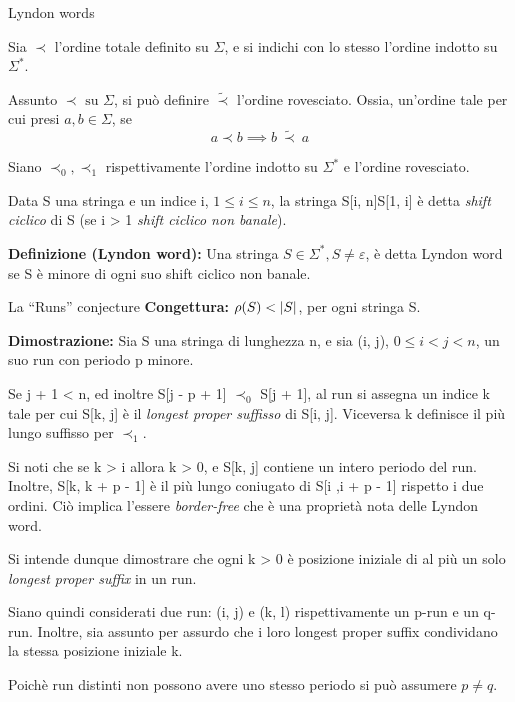 \documentclass{beamer}
\begin{document}
    \begin{frame}{Lyndon words}

        Sia \(\prec\) l'ordine totale definito su \(\Sigma\),
        e si indichi con lo stesso l'ordine indotto su \(\Sigma^{*}\).
        
        Assunto \(\prec \text{ su } \Sigma\), si può definire \(\tilde{\prec}\)
        l'ordine rovesciato. Ossia, un'ordine tale per cui presi \(a, b \in \Sigma\),
        se 
        \[
            a \prec b \implies b \ \tilde{\prec} \ a
        \]

        Siano \(\prec_{0}, \prec_{1}\) rispettivamente l'ordine indotto su 
        \(\Sigma^{*}\) e l'ordine rovesciato.

    \end{frame}
    \begin{frame}
        Data S una stringa e un indice i, \(1 \le i \le n\),
        la stringa S[i, n]S[1, i] è detta \emph{shift ciclico} di S 
        (se i > 1 \emph{shift ciclico non banale}).

        \textbf{Definizione (Lyndon word): } 
        Una stringa \(S \in \Sigma^{*}, S \ne \varepsilon\),
        è detta Lyndon word se S è minore di ogni suo shift ciclico non banale.
    \end{frame}
    \begin{frame}{La ``Runs'' conjecture}
        \textbf{Congettura: } \(\rho(S) < \left\lvert S \right\rvert\), per ogni stringa S.

        \textbf{Dimostrazione: } Sia S una stringa di lunghezza n,
        e sia (i, j), \(0 \le i < j < n\), un suo run con periodo p minore.

        Se j + 1 < n, ed inoltre S[j - p + 1] \(\prec_{0}\) S[j + 1],
        al run si assegna un indice k tale per cui S[k, j] è il \emph{longest proper suffisso}
        di S[i, j]. Viceversa k definisce il più lungo suffisso per \(\prec_{1}\).

        Si noti che se k > i allora k > 0, e S[k, j] contiene un intero periodo del run.
        Inoltre, S[k, k + p - 1] è il più lungo coniugato di S[i ,i + p - 1]
        rispetto i due ordini. Ciò implica l'essere \emph{border-free} %
        che è una proprietà nota delle Lyndon word.
    \end{frame}
    \begin{frame}
        Si intende dunque dimostrare che ogni k > 0 è posizione iniziale 
        di al più un solo \emph{longest proper suffix} in un run.

        Siano quindi considerati due run: (i, j) e (k, l) rispettivamente
        un p-run e un q-run. Inoltre, sia assunto per assurdo che 
        i loro longest proper suffix condividano la stessa posizione iniziale k.

        Poichè run distinti non possono avere uno stesso periodo si può assumere
        \(p \ne q\).
    \end{frame}
\end{document}
